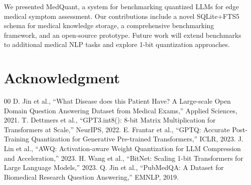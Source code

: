 \documentclass[conference]{IEEEtran}
\begin{document}
We presented MedQuant, a system for benchmarking quantized LLMs for edge medical symptom assessment. Our contributions include a novel SQLite+FTS5 schema for medical knowledge storage, a comprehensive benchmarking framework, and an open-source prototype. Future work will extend benchmarks to additional medical NLP tasks and explore 1-bit quantization approaches.

\section*{Acknowledgment}

\begin{thebibliography}{00}
 D. Jin et al., ``What Disease does this Patient Have? A Large-scale Open Domain Question Answering Dataset from Medical Exams,'' Applied Sciences, 2021.
 T. Dettmers et al., ``GPT3.int8(): 8-bit Matrix Multiplication for Transformers at Scale,'' NeurIPS, 2022.
 E. Frantar et al., ``GPTQ: Accurate Post-Training Quantization for Generative Pre-trained Transformers,'' ICLR, 2023.
 J. Lin et al., ``AWQ: Activation-aware Weight Quantization for LLM Compression and Acceleration,'' 2023.
 H. Wang et al., ``BitNet: Scaling 1-bit Transformers for Large Language Models,'' 2023.
 Q. Jin et al., ``PubMedQA: A Dataset for Biomedical Research Question Answering,'' EMNLP, 2019.
\end{thebibliography}
\end{document}
